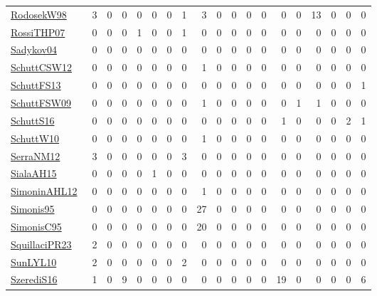 {\begin{longtable}{l*{18}{r}}
\href{papers/RodosekW98.pdf}{RodosekW98}~\cite{RodosekW98} & 3 & 0 & 0 & 0 & 0 & 0 & 1 & 3 & 0 & 0 & 0 & 0 & 0 & 0 & 13 & 0 & 0 & 0\\
\href{papers/RossiTHP07.pdf}{RossiTHP07}~\cite{RossiTHP07} & 0 & 0 & 0 & 1 & 0 & 0 & 1 & 0 & 0 & 0 & 0 & 0 & 0 & 0 & 0 & 0 & 0 & 0\\
\href{papers/Sadykov04.pdf}{Sadykov04}~\cite{Sadykov04} & 0 & 0 & 0 & 0 & 0 & 0 & 0 & 0 & 0 & 0 & 0 & 0 & 0 & 0 & 0 & 0 & 0 & 0\\
\href{papers/SchuttCSW12.pdf}{SchuttCSW12}~\cite{SchuttCSW12} & 0 & 0 & 0 & 0 & 0 & 0 & 0 & 1 & 0 & 0 & 0 & 0 & 0 & 0 & 0 & 0 & 0 & 0\\
\href{papers/SchuttFS13.pdf}{SchuttFS13}~\cite{SchuttFS13} & 0 & 0 & 0 & 0 & 0 & 0 & 0 & 0 & 0 & 0 & 0 & 0 & 0 & 0 & 0 & 0 & 0 & 1\\
\href{papers/SchuttFSW09.pdf}{SchuttFSW09}~\cite{SchuttFSW09} & 0 & 0 & 0 & 0 & 0 & 0 & 0 & 1 & 0 & 0 & 0 & 0 & 0 & 1 & 1 & 0 & 0 & 0\\
\href{papers/SchuttS16.pdf}{SchuttS16}~\cite{SchuttS16} & 0 & 0 & 0 & 0 & 0 & 0 & 0 & 0 & 0 & 0 & 0 & 0 & 1 & 0 & 0 & 0 & 2 & 1\\
\href{papers/SchuttW10.pdf}{SchuttW10}~\cite{SchuttW10} & 0 & 0 & 0 & 0 & 0 & 0 & 0 & 1 & 0 & 0 & 0 & 0 & 0 & 0 & 0 & 0 & 0 & 0\\
\href{papers/SerraNM12.pdf}{SerraNM12}~\cite{SerraNM12} & 3 & 0 & 0 & 0 & 0 & 0 & 3 & 0 & 0 & 0 & 0 & 0 & 0 & 0 & 0 & 0 & 0 & 0\\
\href{papers/SialaAH15.pdf}{SialaAH15}~\cite{SialaAH15} & 0 & 0 & 0 & 0 & 1 & 0 & 0 & 0 & 0 & 0 & 0 & 0 & 0 & 0 & 0 & 0 & 0 & 0\\
\href{papers/SimoninAHL12.pdf}{SimoninAHL12}~\cite{SimoninAHL12} & 0 & 0 & 0 & 0 & 0 & 0 & 0 & 1 & 0 & 0 & 0 & 0 & 0 & 0 & 0 & 0 & 0 & 0\\
\href{papers/Simonis95.pdf}{Simonis95}~\cite{Simonis95} & 0 & 0 & 0 & 0 & 0 & 0 & 0 & 27 & 0 & 0 & 0 & 0 & 0 & 0 & 0 & 0 & 0 & 0\\
\href{papers/SimonisC95.pdf}{SimonisC95}~\cite{SimonisC95} & 0 & 0 & 0 & 0 & 0 & 0 & 0 & 20 & 0 & 0 & 0 & 0 & 0 & 0 & 0 & 0 & 0 & 0\\
\href{papers/SquillaciPR23.pdf}{SquillaciPR23}~\cite{SquillaciPR23} & 2 & 0 & 0 & 0 & 0 & 0 & 0 & 0 & 0 & 0 & 0 & 0 & 0 & 0 & 0 & 0 & 0 & 0\\
\href{papers/SunLYL10.pdf}{SunLYL10}~\cite{SunLYL10} & 2 & 0 & 0 & 0 & 0 & 0 & 2 & 0 & 0 & 0 & 0 & 0 & 0 & 0 & 0 & 0 & 0 & 0\\
\href{papers/SzerediS16.pdf}{SzerediS16}~\cite{SzerediS16} & 1 & 0 & 9 & 0 & 0 & 0 & 0 & 0 & 0 & 0 & 0 & 0 & 19 & 0 & 0 & 0 & 0 & 6\\

\end{longtable}}
